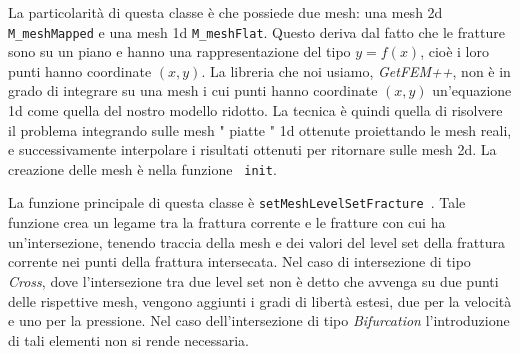 La particolarità di questa classe è che possiede due mesh: una mesh 2d \texttt{M\_meshMapped} e una mesh 1d \texttt{M\_meshFlat}. Questo deriva dal fatto che le fratture sono su un piano e hanno una rappresentazione del tipo $y=f(x)$, cioè i loro punti hanno coordinate $(x,y)$. La libreria che noi usiamo, \textit{GetFEM++}, non è in grado di integrare su una mesh i cui punti hanno coordinate $(x,y)$ un'equazione 1d come quella del nostro modello ridotto. La tecnica è quindi quella di risolvere il problema integrando sulle mesh " piatte " 1d ottenute proiettando le mesh reali, e successivamente interpolare i risultati ottenuti per ritornare sulle mesh 2d. La creazione delle mesh è nella funzione \texttt{ init}.
\par La funzione principale di questa classe è  \texttt{setMeshLevelSetFracture }.
Tale funzione crea un legame tra la frattura corrente e le fratture con cui ha un'intersezione, tenendo traccia della mesh e dei valori del level set della frattura corrente nei punti della frattura intersecata. Nel caso di intersezione di tipo \textit{Cross}, dove l'intersezione tra due level set non è detto che avvenga su due punti delle rispettive mesh, vengono aggiunti i gradi di libertà estesi, due per la velocità e uno per la pressione. Nel caso dell'intersezione di tipo \textit{Bifurcation} l'introduzione di tali elementi non si rende necessaria.


